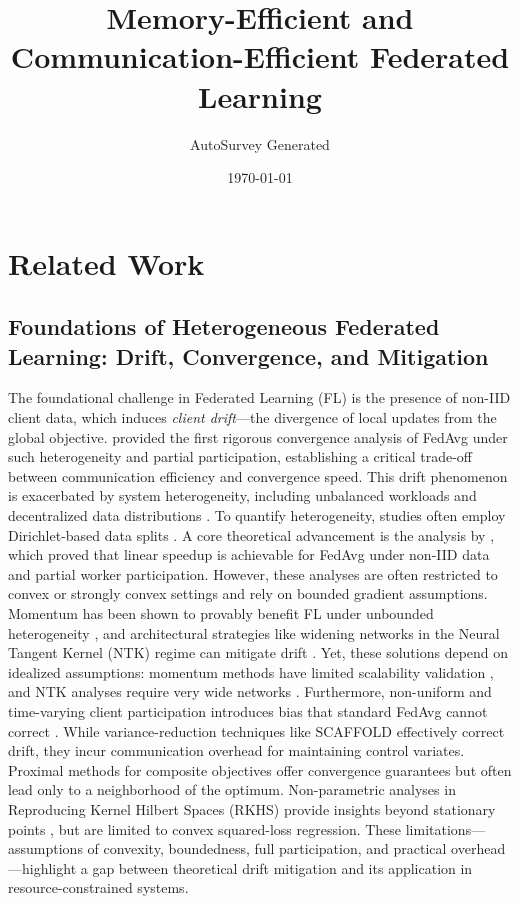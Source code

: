 \documentclass[11pt]{article}
\title{Memory-Efficient and Communication-Efficient Federated Learning}
\author{AutoSurvey Generated}
\date{\today}
\begin{document}
\maketitle

\section{Related Work}

\subsection{Foundations of Heterogeneous Federated Learning: Drift, Convergence, and Mitigation}
The foundational challenge in Federated Learning (FL) is the presence of non-IID client data, which induces \textit{client drift}—the divergence of local updates from the global objective. \citet{li2019convergence} provided the first rigorous convergence analysis of FedAvg under such heterogeneity and partial participation, establishing a critical trade-off between communication efficiency and convergence speed. This drift phenomenon is exacerbated by system heterogeneity, including unbalanced workloads \citep{daning2017weighted} and decentralized data distributions \citep{Tang2018D2DT}. To quantify heterogeneity, studies often employ Dirichlet-based data splits \citep{reguieg2023comparative}. A core theoretical advancement is the analysis by \citet{Yang2021AchievingLS}, which proved that linear speedup is achievable for FedAvg under non-IID data and partial worker participation. However, these analyses are often restricted to convex or strongly convex settings \citep{qu2023unified} and rely on bounded gradient assumptions. Momentum has been shown to provably benefit FL under unbounded heterogeneity \citep{Cheng2023MomentumBN}, and architectural strategies like widening networks in the Neural Tangent Kernel (NTK) regime can mitigate drift \citep{jian2025widening}. Yet, these solutions depend on idealized assumptions: momentum methods have limited scalability validation \citep{Cheng2023MomentumBN}, and NTK analyses require very wide networks \citep{jian2025widening}. Furthermore, non-uniform and time-varying client participation introduces bias that standard FedAvg cannot correct \citep{xiang2023towards}. While variance-reduction techniques like SCAFFOLD \citep{karimireddy2020scaffold} effectively correct drift, they incur communication overhead for maintaining control variates. Proximal methods for composite objectives \citep{Zhou2025FedCanonNC, zhang2025convex} offer convergence guarantees but often lead only to a neighborhood of the optimum. Non-parametric analyses in Reproducing Kernel Hilbert Spaces (RKHS) provide insights beyond stationary points \citep{su2023non}, but are limited to convex squared-loss regression. These limitations—assumptions of convexity, boundedness, full participation, and practical overhead—highlight a gap between theoretical drift mitigation and its application in resource-constrained systems.
\end{document}
